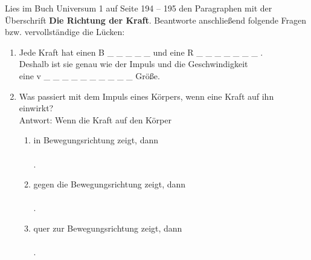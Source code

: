 \documentclass[task=1]{exercise}
\begin{document}
  Lies im Buch Universum 1 auf Seite 194 -- 195 den Paragraphen mit der \"Uberschrift {\bfseries Die Richtung der Kraft}. Beantworte anschlie{\ss}end folgende Fragen bzw. vervollst\"andige die L\"ucken:
  \begin{enumerate}[label=\textnormal{\alph*)}]
    \item Jede Kraft hat einen B \_ \_ \_ \_ \_ und eine R \_ \_ \_ \_ \_ \_ \_ .\\
    Deshalb ist sie genau wie der Impuls und die Geschwindigkeit\\
    eine v \_ \_ \_ \_ \_ \_ \_ \_ \_ \_ Gr\"o{\ss}e.
    \item Was passiert mit dem Impuls eines K\"orpers, wenn eine Kraft auf ihn einwirkt?\\
    Antwort: Wenn die Kraft auf den K\"orper
    \begin{enumerate}[label=\textnormal{\roman*)}]
      \item in Bewegungsrichtung zeigt, dann\\~\\
      \luecke{\textwidth}.
      \item gegen die Bewegungsrichtung zeigt, dann\\~\\
      \luecke{\textwidth}.
      \item quer zur Bewegungsrichtung zeigt, dann\\~\\
      \luecke{\textwidth}.
    \end{enumerate}
  \end{enumerate}
  
\end{document}
